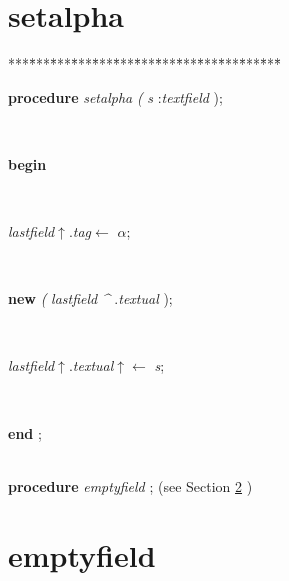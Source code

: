 \section{setalpha}\label{sec:csvfilereader/getdatamatrix/recursedown/recurse/getcolheaders/recurse/getrowheaders/recurse/colcount/getcell/removetrailingnull/onlynulls/rowcount/isint/printcsv/parsecsvfile/thetoken/peek/isoneof/nextsymbol/have/haveoneof/initialise/resolvealpha/resolvedigits/resolvetoken/markbegin/markendsetalpha}

\begin{tabbing}
***\=***\=***\=***\=***\=***\=***\=***\=***\=***\=***\=***\=***\=\kill
\parbox{14cm}{\textsf{\textbf{procedure}  \textit{setalpha} \textit{(} \textit{s} :\textit{textfield} );}}\\
\+\parbox{14cm}{\textsf{\textbf{begin} }}\\
\parbox{14cm}{\textsf{\textit{lastfield}$\uparrow$.\textit{tag}$\leftarrow$ \textit{$\alpha$}}; }\\
\parbox{14cm}{\textsf{\textbf{new} \textit{(} \textit{lastfield} \textit{\^{}} .\textit{textual} );}}\\
\parbox{14cm}{\textsf{\textit{lastfield}$\uparrow$.\textit{textual}$\uparrow$\textit{}$\leftarrow$ \textit{s}}; }\\
\<\-\parbox{14cm}{\textsf{\textbf{end} ;}}\\
\+\textsf{\textbf{procedure}  \textit{emptyfield} ;} (see Section \ref{sec:csvfilereader/getdatamatrix/recursedown/recurse/getcolheaders/recurse/getrowheaders/recurse/colcount/getcell/removetrailingnull/onlynulls/rowcount/isint/printcsv/parsecsvfile/thetoken/peek/isoneof/nextsymbol/have/haveoneof/initialise/resolvealpha/resolvedigits/resolvetoken/markbegin/markend/setalphaemptyfield} )\\
\end{tabbing}
\section{emptyfield}\label{sec:csvfilereader/getdatamatrix/recursedown/recurse/getcolheaders/recurse/getrowheaders/recurse/colcount/getcell/removetrailingnull/onlynulls/rowcount/isint/printcsv/parsecsvfile/thetoken/peek/isoneof/nextsymbol/have/haveoneof/initialise/resolvealpha/resolvedigits/resolvetoken/markbegin/markend/setalphaemptyfield}


